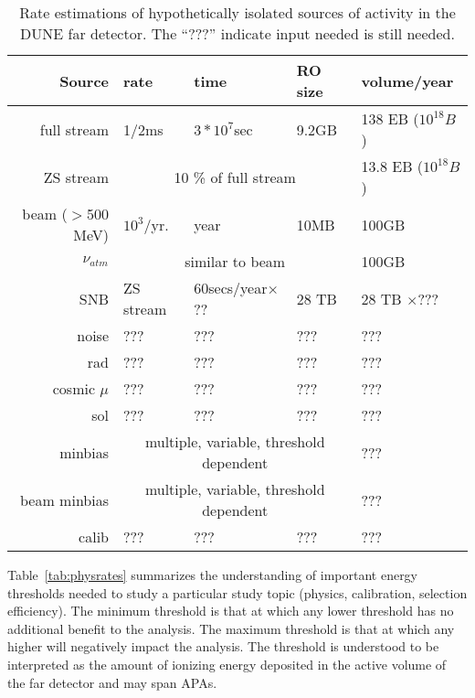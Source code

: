 \begin{table}[htbf]
  \centering
  \begin{tabular}{|r|l|l|l|l|}
    \hline
    Source & rate & time & RO size & volume/year\\
    \hline
    \hline
    full stream & 1/2ms & $3*10^{7}$sec &  9.2GB & 138 EB ($10^{18}B$) \\
    \hline
    ZS stream &  \multicolumn{3}{c|}{10 \% of full stream} & 13.8 EB ($10^{18}B$) \\
    \hline
    beam ($>$500 MeV)  & $10^{3}$/yr.  & year  & 10MB & 100GB \\
    \hline
    $\nu_{atm}$& \multicolumn{3}{c|}{similar to beam}  & 100GB \\
    \hline
    SNB  & ZS stream & 60secs/year$\times$?? & 28 TB & 28 TB $\times$??? \\
    \hline
    noise            & ??? & ??? & ??? & ??? \\
    \hline
    rad              & ??? & ??? & ??? & ??? \\
    \hline
    cosmic $\mu$     & ??? & ??? & ??? & ??? \\
    \hline
    sol              & ??? & ??? & ??? & ??? \\
    \hline
    minbias & \multicolumn{3}{c|}{multiple, variable, threshold dependent} & ??? \\
    \hline
    beam minbias & \multicolumn{3}{c|}{multiple, variable, threshold dependent} & ??? \\
    \hline
    calib            & ??? & ??? & ??? & ??? \\
    \hline
  \end{tabular}
  \caption{Rate estimations of hypothetically isolated sources of activity in
    the DUNE far detector.
  The ``???'' indicate input needed is still needed.}
  \label{tab:rate-summary}
\end{table}

Table~\ref{tab:physrates} summarizes the understanding of important
energy thresholds needed to study a particular study topic (physics,
calibration, selection efficiency).
The minimum threshold is that at which any lower threshold has no
additional benefit to the analysis.
The maximum threshold is that at which any higher will negatively
impact the analysis.
The threshold is understood to be interpreted as the amount of
ionizing energy deposited in the active volume of the far detector
and may span APAs.

